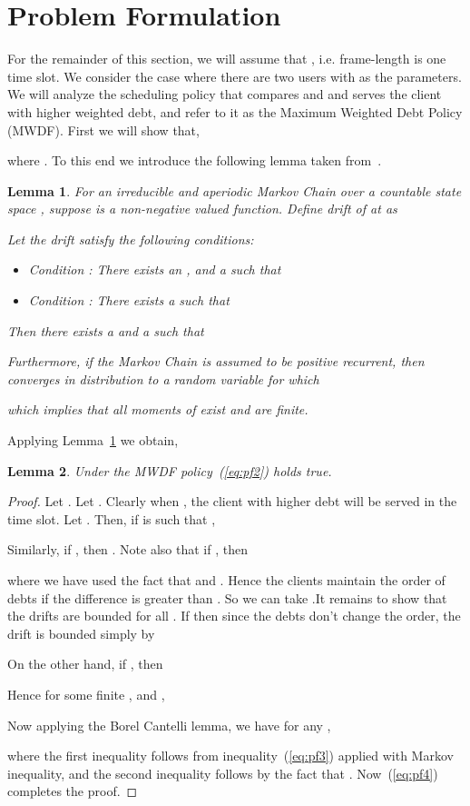 \documentclass[letterpaper, 10 pt, conference]{ieeeconf}
\newtheorem{lemma}{Lemma}
\begin{document}
\section{Problem Formulation}\label{sec2}
For the remainder of this section, we will assume that , i.e. frame-length is one time slot. We consider the case where there are two users with  as the parameters. We will analyze the scheduling policy that compares  and  and serves the client with higher weighted debt, and refer to it as the Maximum Weighted Debt Policy (MWDF). 
First we will show that, 

where .
To this end we introduce the following lemma taken from~\cite{c2}.
\begin{lemma}\label{lemma1}
For an irreducible and aperiodic Markov Chain  over a countable state space , suppose  is a non-negative valued function. Define drift of  at  as

Let the drift satisfy the following conditions:
\begin{itemize}
\item Condition : There exists an , and a  such that 

\item Condition : There exists a  such that 

\end{itemize}
Then there exists a  and a  such that 

Furthermore, if the Markov Chain is assumed to be positive recurrent, then  converges in distribution to a random variable  for which 

which implies that all moments of  exist and are finite.
 \end{lemma}
 Applying Lemma~\ref{lemma1} we obtain,
 \begin{lemma}\label{lemma2}
 Under the MWDF policy~(\ref{eq:pf2}) holds true.
\end{lemma} 
\begin{proof} Let . Let . Clearly when , the client with higher debt will be served in the time slot. Let . 
Then, if  is such that ,

Similarly, if , then . Note also that if , then 

where we have used the fact that  and . Hence the clients maintain the order of debts if the difference is greater than . 
So we can take .It remains to show that the drifts are bounded for all . If  then since the debts don't change the order, the drift is bounded simply by 

On the other hand, if , then

Hence for some finite , and , 


Now applying the Borel Cantelli lemma, we have for any ,

where the first inequality follows from inequality~(\ref{eq:pf3}) applied with Markov inequality, and the second inequality follows by the fact that . Now~(\ref{eq:pf4}) completes the proof. 
\end{proof}
\end{document}
